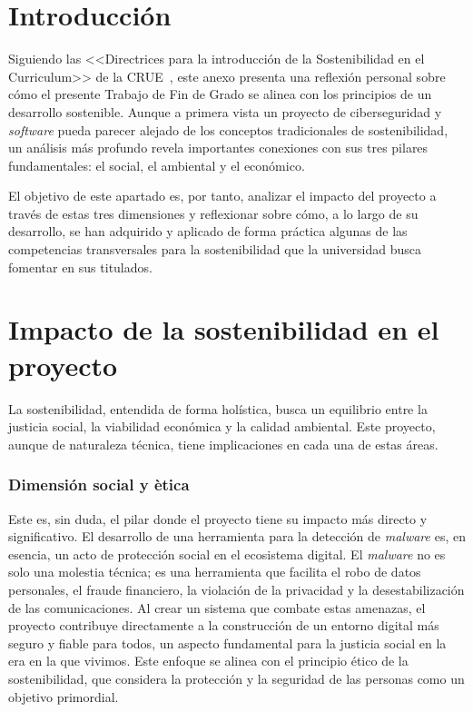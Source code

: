 
\section{Introducción}

Siguiendo las <<Directrices para la introducción de la Sostenibilidad en el Curriculum>> de la CRUE~\cite{crue}, este anexo presenta una reflexión personal sobre cómo el presente Trabajo de Fin de Grado se alinea con los principios de un desarrollo sostenible. Aunque a primera vista un proyecto de ciberseguridad y \textit{software} pueda parecer alejado de los conceptos tradicionales de sostenibilidad, un análisis más profundo revela importantes conexiones con sus tres pilares fundamentales: el social, el ambiental y el económico.

El objetivo de este apartado es, por tanto, analizar el impacto del proyecto a través de estas tres dimensiones y reflexionar sobre cómo, a lo largo de su desarrollo, se han adquirido y aplicado de forma práctica algunas de las competencias transversales para la sostenibilidad que la universidad busca fomentar en sus titulados.

\section{Impacto de la sostenibilidad en el proyecto}

La sostenibilidad, entendida de forma holística, busca un equilibrio entre la justicia social, la viabilidad económica y la calidad ambiental. Este proyecto, aunque de naturaleza técnica, tiene implicaciones en cada una de estas áreas.

\subsubsection{Dimensión social y ètica}
Este es, sin duda, el pilar donde el proyecto tiene su impacto más directo y significativo. El desarrollo de una herramienta para la detección de \textit{malware} es, en esencia, un acto de protección social en el ecosistema digital. El \textit{malware} no es solo una molestia técnica; es una herramienta que facilita el robo de datos personales, el fraude financiero, la violación de la privacidad y la desestabilización de las comunicaciones. Al crear un sistema que combate estas amenazas, el proyecto contribuye directamente a la construcción de un entorno digital más seguro y fiable para todos, un aspecto fundamental para la justicia social en la era en la que vivimos. Este enfoque se alinea con el principio ético de la sostenibilidad, que considera la protección y la seguridad de las personas como un objetivo primordial.

